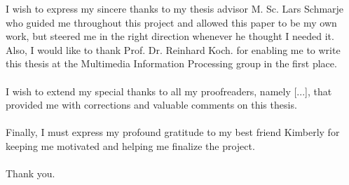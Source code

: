 
\begin{acknowledgements}      

    I wish to express my sincere thanks to my thesis advisor M. Sc. Lars Schmarje who guided me throughout this project and allowed this paper to be my own work, but steered me in the right direction whenever he thought I needed it. Also, I would like to thank Prof. Dr. Reinhard Koch. for enabling me to write this thesis at the Multimedia Information Processing group in the first place.\\
    \\I wish to extend my special thanks to all my proofreaders, namely [...], that provided me with corrections and valuable comments on this thesis.\\
    \\Finally, I must express my profound gratitude to my best friend Kimberly for keeping me motivated and helping me finalize the project.\\
    \\Thank you. 


\end{acknowledgements}
